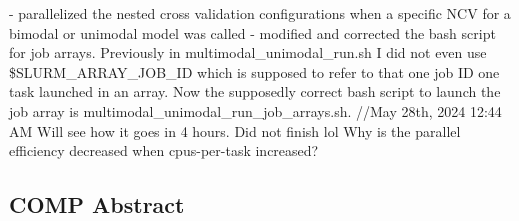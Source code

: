 \documentclass{article}%
\begin{document}
\newline%
%
{-} parallelized the nested cross validation configurations when a specific NCV for a bimodal or unimodal model was called %
\newline%
\newline%
%
{-} modified and corrected the bash script for job arrays. Previously in multimodal\_unimodal\_run.sh I did not even use \$SLURM\_ARRAY\_JOB\_ID which is supposed to refer to that one job ID one task launched in an array. Now the supposedly correct bash script to launch the job array is multimodal\_unimodal\_run\_job\_arrays.sh. %
\newline%
\newline%
%
%
\newline%
\newline%
%
//May 28th, 2024 12:44 AM %
\newline%
\newline%
%
Will see how it goes in 4 hours. %
\newline%
\newline%
%
Did not finish lol%
\newline%
\newline%
%
%
\newline%
\newline%
%
Why is the parallel efficiency decreased when cpus{-}per{-}task increased? %
\newline%
\newline%
%
\subsection{COMP Abstract }%
\label{subsec:COMPAbstract}%
\end{document}
